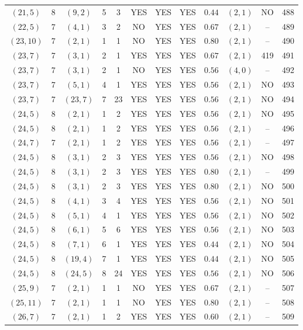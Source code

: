 \begin{longtable}{|c|c|c|c|c|c|c|c|c|c|c|c|}
$(21,5)$ & 8 & $(9,2)$ & 5 & 3 & YES & YES & YES & $0.44$ & $(2,1)$ & NO & 488\\
$(22,5)$ & 7 & $(4,1)$ & 3 & 2 & NO & YES & YES & $0.67$ & $(2,1)$ & -- & 489\\
$(23,10)$ & 7 & $(2,1)$ & 1 & 1 & NO & YES & YES & $0.80$ & $(2,1)$ & -- & 490\\
$(23,7)$ & 7 & $(3,1)$ & 2 & 1 & YES & YES & YES & $0.67$ & $(2,1)$ & 419 & 491\\
$(23,7)$ & 7 & $(3,1)$ & 2 & 1 & NO & YES & YES & $0.56$ & $(4,0)$ & -- & 492\\
$(23,7)$ & 7 & $(5,1)$ & 4 & 1 & YES & YES & YES & $0.56$ & $(2,1)$ & NO & 493\\
$(23,7)$ & 7 & $(23,7)$ & 7 & 23 & YES & YES & YES & $0.56$ & $(2,1)$ & NO & 494\\
$(24,5)$ & 8 & $(2,1)$ & 1 & 2 & YES & YES & YES & $0.56$ & $(2,1)$ & NO & 495\\
$(24,5)$ & 8 & $(2,1)$ & 1 & 2 & YES & YES & YES & $0.56$ & $(2,1)$ & -- & 496\\
$(24,7)$ & 7 & $(2,1)$ & 1 & 2 & YES & YES & YES & $0.56$ & $(2,1)$ & -- & 497\\
$(24,5)$ & 8 & $(3,1)$ & 2 & 3 & YES & YES & YES & $0.56$ & $(2,1)$ & NO & 498\\
$(24,5)$ & 8 & $(3,1)$ & 2 & 3 & YES & YES & YES & $0.80$ & $(2,1)$ & -- & 499\\
$(24,5)$ & 8 & $(3,1)$ & 2 & 3 & YES & YES & YES & $0.80$ & $(2,1)$ & NO & 500\\
$(24,5)$ & 8 & $(4,1)$ & 3 & 4 & YES & YES & YES & $0.56$ & $(2,1)$ & NO & 501\\
$(24,5)$ & 8 & $(5,1)$ & 4 & 1 & YES & YES & YES & $0.56$ & $(2,1)$ & NO & 502\\
$(24,5)$ & 8 & $(6,1)$ & 5 & 6 & YES & YES & YES & $0.56$ & $(2,1)$ & NO & 503\\
$(24,5)$ & 8 & $(7,1)$ & 6 & 1 & YES & YES & YES & $0.44$ & $(2,1)$ & NO & 504\\
$(24,5)$ & 8 & $(19,4)$ & 7 & 1 & YES & YES & YES & $0.44$ & $(2,1)$ & NO & 505\\
$(24,5)$ & 8 & $(24,5)$ & 8 & 24 & YES & YES & YES & $0.56$ & $(2,1)$ & NO & 506\\
$(25,9)$ & 7 & $(2,1)$ & 1 & 1 & NO & YES & YES & $0.67$ & $(2,1)$ & -- & 507\\
$(25,11)$ & 7 & $(2,1)$ & 1 & 1 & NO & YES & YES & $0.80$ & $(2,1)$ & -- & 508\\
$(26,7)$ & 7 & $(2,1)$ & 1 & 2 & YES & YES & YES & $0.60$ & $(2,1)$ & -- & 509\\

\end{longtable}

